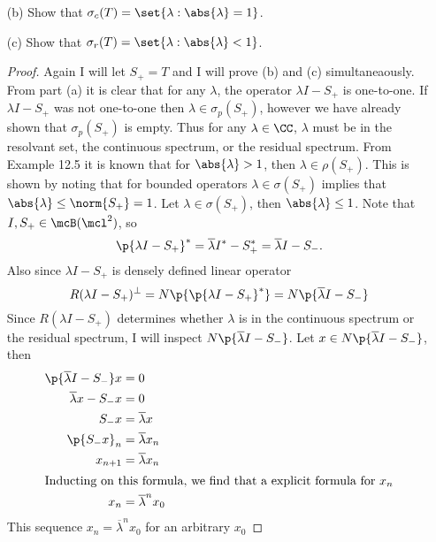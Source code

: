 \documentclass[11pt, oneside]{article}
\begin{document}
\begin{enumerate}
\begin{enumerate}
      \item[(b)]
        Show that $\sigma_c(T) = \set{\lambda: \abs{\lambda}= 1}$.

      \item[(c)]
        Show that $\sigma_r(T) = \set{\lambda: \abs{\lambda} < 1}$.

        \begin{proof}
          Again I will let $S_+ = T$ and I will prove (b) and (c) simultaneaously.
          From part (a) it is clear that for any $\lambda$, the operator
          $\lambda I - S_+$ is one-to-one.
          If $\lambda I - S_+$ was not one-to-one then
          $\lambda \in \sigma_p(S_+)$, however we have already shown that
          $\sigma_p(S_+)$ is empty.
          Thus for any $\lambda \in \CC$, $\lambda$ must be in the resolvant
          set, the continuous spectrum, or the residual spectrum.
          From Example 12.5 it is known that for $\abs{\lambda} > 1$, then
          $\lambda \in \rho(S_+)$.
          This is shown by noting that for bounded operators
          $\lambda \in \sigma(S_+)$ implies that
          $\abs{\lambda} \le \norm{S_+} = 1$.
          Let $\lambda \in \sigma(S_+)$, then $\abs{\lambda} \le 1$.
          Note that $I, S_+ \in \mcB(\mcl^2)$, so
          \[
            \p{\lambda I - S_+}^* = \overline{\lambda} I^* - S_+^* = \overline{\lambda} I - S_-.
          \]
          Also since $\lambda I - S_+$ is densely defined linear operator
          \[
            R(\lambda I - S_+)^{\perp} = N\p{\p{\lambda I - S_+}^*} = N\p{\overline{\lambda} I - S_-}
          \]
          Since $R(\lambda I - S_+)$ determines whether $\lambda$ is in the
          continuous spectrum or the residual spectrum, I will inspect
          $N\p{\overline{\lambda} I - S_-}$.
          Let $x \in N\p{\overline{\lambda} I - S_-}$, then
          \begin{align*}
            \p{\overline{\lambda} I - S_-}x &= 0 \\
            \overline{\lambda} x - S_-x &= 0 \\
            S_-x &= \overline{\lambda}x \\
            \p{S_-x}_n &= \overline{\lambda} x_n \\
            x_{n+1} &= \overline{\lambda} x_n \\
            \intertext{Inducting on this formula, we find that a explicit
              formula for $x_n$}
            x_n &= \overline{\lambda}^n x_0
          \end{align*}
          This sequence $x_n = \overline{\lambda}^n x_0$ for an arbitrary $x_0$

\end{proof}
\end{enumerate}
\end{enumerate}
\end{document}
